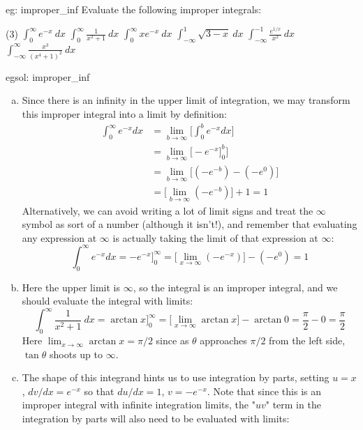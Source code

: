 \begin{eg}[]{eg: improper_inf}
    Evaluate the following improper integrals:
    \begin{tasks}(3)
        \task $\int_0^\infty e^{-x}~dx$
        \task $\int_0^\infty \frac{1}{x^2+1}~dx$
        \task $\int_0^\infty xe^{-x}~dx$
        \task $\int_{-\infty}^1 \sqrt{3-x}~dx$
        \task $\int_{-\infty}^{-1} \frac{e^{1/x}}{x^2}~dx$
        \task $\int_{-\infty}^{\infty} \frac{x^3}{(x^4+1)^2}~dx$
    \end{tasks}
\end{eg}

\begin{egsol}[]{egsol: improper_inf}
    \begin{enumerate}[a)]
        \item Since there is an infinity in the upper limit of integration, we may transform this improper integral into a limit by definition:
        \begin{align*}
            \int_0^\infty e^{-x} dx &= \lim_{b \rightarrow \infty} \Big[\int_0^b e^{-x} dx\Big]\\
            &= \lim_{b \rightarrow \infty} \Big[-e^{-x}\big]_0^b \Big]\\
            &= \lim_{b \rightarrow \infty} \Big[(-e^{-b}) - (-e^{0})\Big]\\
            &= \big[\lim_{b \rightarrow \infty} (-e^{-b})\big] + 1 = 1
        \end{align*}
        Alternatively, we can avoid writing a lot of limit signs and treat the $\infty$ symbol as sort of a number (although it isn't!), and remember that evaluating any expression at $\infty$ is actually taking the limit of that expression at $\infty$:
        \[\int_0^\infty e^{-x} dx = -e^{-x}\Big]_0^\infty = \big[\lim_{x \rightarrow \infty} (-e^{-x})\big] - (- e^0) = 1\]
        \item Here the upper limit is $\infty$, so the integral is an improper integral, and we should evaluate the integral with limits:
        \[\int_0^\infty \frac{1}{x^2+1}~dx = \arctan x\Big]_0^\infty = \big[\lim_{x \rightarrow \infty} \arctan x\big] - \arctan 0 = \frac{\pi}{2} - 0 = \frac{\pi}{2}\]
        Here $\lim_{x \rightarrow \infty} \arctan x = \pi/2$ since as $\theta$ approaches $\pi/2$ from the left side, $\tan \theta$ shoots up to $\infty$.
        \item The shape of this integrand hints us to use integration by parts, setting $u = x$, $dv/dx = e^{-x}$ so that $du/dx = 1$, $v = -e^{-x}$.  Note that since this is an improper integral with infinite integration limits, the "$uv$" term in the integration by parts will also need to be evaluated with limits:

\end{enumerate}
\end{egsol}
